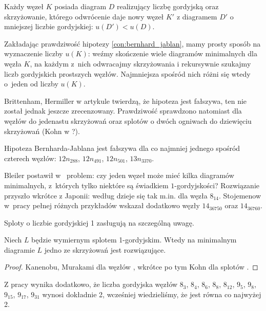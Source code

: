 \begin{conjecture}
    \label{con:bernhard_jablan}
    Każdy węzeł $K$ posiada diagram $D$ realizujący liczbę gordyjską oraz skrzyżowanie, którego odwrócenie daje nowy węzeł $K'$ z diagramem $D'$ o mniejszej liczbie gordyjskiej: $u(D') < u(D)$.
\end{conjecture}

Zakładając prawdziwość hipotezy \ref{con:bernhard_jablan}, mamy prosty sposób na wyznaczenie liczby $u(K)$: weźmy skończenie wiele diagramów minimalnych dla węzła $K$, na każdym z~nich odwracajmy skrzyżowania i rekursywnie szukajmy liczb gordyjskich prostszych węzłów.
Najmniejsza spośród nich różni się wtedy o~jeden od liczby $u(K)$.

Brittenham, Hermiller w artykule \cite{brittenham17} twierdzą, że hipoteza jest fałszywa, ten nie został jednak jeszcze zrecenzowany.
Prawdziwość sprawdzono natomiast dla węzłów do jedenastu skrzyżowań oraz splotów o dwóch ogniwach do dziewięciu skrzyżowań (Kohn w \cite{kohn93}?).

\begin{example}
    Hipoteza Bernharda-Jablana jest fałszywa dla co najmniej jednego spośród czterech węzłów: $12n_{288}$, $12n_{491}$, $12n_{501}$, $13n_{3370}$.
\end{example}

Bleiler postawił w~\cite{bleiler84} problem: czy jeden węzeł może mieć kilka diagramów minimalnych, z~których tylko niektóre są świadkiem $1$-gordyjskości?
Rozwiązanie przyszło wkrótce z Japonii: według \cite{kanenobumurakami86} dzieje się tak m.in. dla węzła $8_{14}$.
Stojemenow w~pracy \cite{stoimenow01} pełnej różnych przykładów wskazał dodatkowo węzły $14_{36750}$ oraz $14_{36760}$.

Sploty o liczbie gordyjskiej 1 zasługują na szczególną uwagę.

\begin{proposition}
    Niech $L$ będzie wymiernym splotem 1-gordyjskim.
    Wtedy na minimalnym diagramie $L$ jedno ze skrzyżowań jest rozwiązujące.
\end{proposition}

\begin{proof}
    Kanenobu, Murakami dla węzłów \cite{kanenobumurakami86}, wkrótce po tym Kohn dla splotów \cite{kohn91}.
\end{proof}

Z pracy \cite{kanenobumurakami86} wynika dodatkowo, że liczba gordyjska węzłów $8_{3}$, $8_{4}$, $8_{6}$, $8_{8}$, $8_{12}$, $9_{5}$, $9_{8}$, $9_{15}$, $9_{17}$, $9_{31}$ wynosi dokładnie 2, wcześniej wiedzieliśmy, że jest równa co najwyżej 2.

